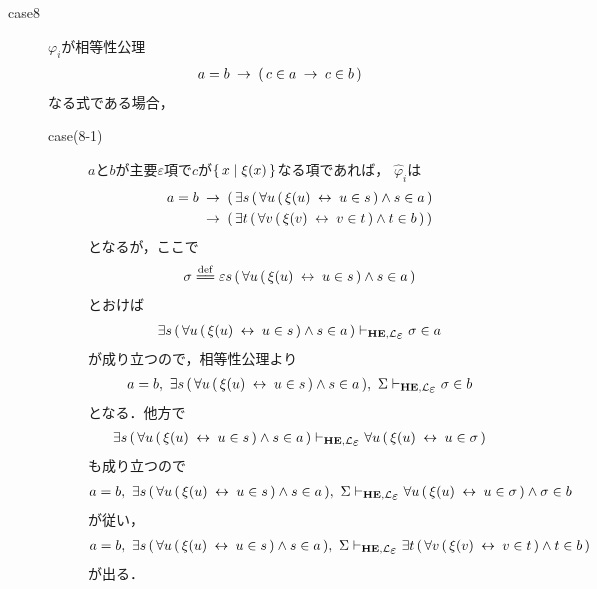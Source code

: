 \begin{metaprf}
\begin{description}
			\item[case8] $\varphi_{i}$が相等性公理
				\begin{align}
					a = b \hspace{0.25em}\rightarrow\hspace{0.25em} (\, c \in a \hspace{0.25em}\rightarrow\hspace{0.25em} c \in b\, )
				\end{align}
				なる式である場合，
				\begin{description}
					\item[case(8-1)] $a$と$b$が主要$\varepsilon$項で$c$が$\{\, x \mid \xi(x)\, \}$なる項であれば，
						$\widehat{\varphi}_{i}$は
						\begin{align}
							a = b &\hspace{0.25em}\rightarrow\hspace{0.25em} (\, \exists s\, (\, \forall u\, (\, \xi(u) \hspace{0.25em}\leftrightarrow\hspace{0.25em} u \in s\, ) \wedge s \in a\, ) \\
							&\hspace{0.25em}\rightarrow\hspace{0.25em} (\, \exists t\, (\, \forall v\, (\, \xi(v) \hspace{0.25em}\leftrightarrow\hspace{0.25em} v \in t\, ) \wedge t \in b\, )\, )
						\end{align}
						となるが，ここで
						\begin{align}
							\sigma \defeq \varepsilon s \, (\, \forall u\, (\, \xi(u) \lrarrow u \in s\, ) \wedge s \in a\, )
						\end{align}
						とおけば
						\begin{align}
							\exists s \, (\, \forall u\, (\, \xi(u) \lrarrow u \in s\, ) \wedge s \in a\, )
							\provable{\mbox{{\bf HE}},\lang{\varepsilon}} \sigma \in a
						\end{align}
						が成り立つので，相等性公理より
						\begin{align}
							a = b,\ \exists s \, (\, \forall u\, (\, \xi(u) \lrarrow u \in s\, ) \wedge s \in a\, ),\ \Sigma
							\provable{\mbox{{\bf HE}},\lang{\varepsilon}} \sigma \in b
						\end{align}
						となる．他方で
						\begin{align}
							\exists s \, (\, \forall u\, (\, \xi(u) \lrarrow u \in s\, ) \wedge s \in a\, )
							\provable{\mbox{{\bf HE}},\lang{\varepsilon}} \forall u\, (\, \xi(u) \lrarrow u \in \sigma\, ) 
						\end{align}
						も成り立つので
						\begin{align}
							a = b,\ \exists s \, (\, \forall u\, (\, \xi(u) \lrarrow u \in s\, ) \wedge s \in a\, ),\ \Sigma
							\provable{\mbox{{\bf HE}},\lang{\varepsilon}} \forall u\, (\, \xi(u) \lrarrow u \in \sigma\, ) \wedge \sigma \in b
						\end{align}
						が従い，
						\begin{align}
							a = b,\ \exists s \, (\, \forall u\, (\, \xi(u) \lrarrow u \in s\, ) \wedge s \in a\, ),\ \Sigma
							\provable{\mbox{{\bf HE}},\lang{\varepsilon}} \exists t\, (\, \forall v\, (\, \xi(v) \lrarrow v \in t\, ) \wedge t \in b\, )
						\end{align}
						が出る．
						

\end{description}
\end{description}
\end{metaprf}
